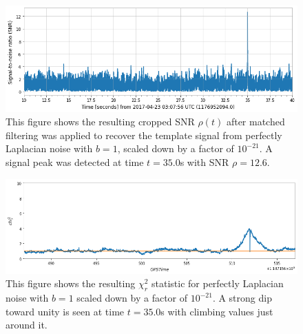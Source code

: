 \documentclass[preprint,
letterpaper,
 amsmath,amssymb,
 aps,
]{revtex4-2}
\begin{document}
\begin{widetext}
\begin{figure}[t]
\includegraphics[width = .9\textwidth]{laplacian b=1 template 1.png}
\caption{This figure shows the resulting cropped SNR $\rho(t)$ after matched filtering was applied to recover the template signal from perfectly Laplacian noise with $b=1$, scaled down by a factor of $10^{-21}$. A signal peak was detected at time $t = 35.0$s with SNR $\rho = 12.6$.}

\centering
\end{figure} 

\begin{figure}[t]
\includegraphics[width = .9\textwidth]{chi2 laplace b=1 zoomed.png}
\caption{This figure shows the resulting $\chi^2_r$ statistic for perfectly Laplacian noise with $b=1$ scaled down by a factor of $10^{-21}$. A strong dip toward unity is seen at time $t = 35.0$s with climbing values just around it.}
\centering
\end{figure} 
\end{widetext}
\end{document}
